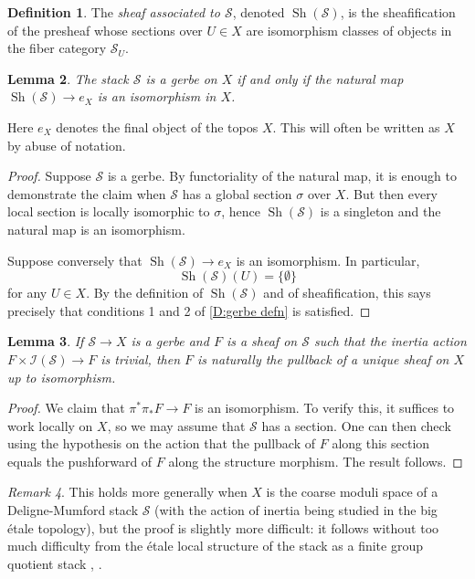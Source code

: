 \documentclass[11pt]{amsart}
\newcommand{\ms}[1]{\mathscr #1}
\DeclareMathOperator{\sh}{Sh}
\renewcommand{\[}{[\!\hspace{0.03em}[}
\renewcommand{\]}{]\!\hspace{0.03em}]}
\renewcommand{\(}{(\!\hspace{0.03em}(}
\renewcommand{\)}{)\!\hspace{0.03em})}
\newtheorem{lem}{Lemma}[subsubsection]%
\theoremstyle{definition}
\newtheorem{defn}[lem]{Definition}
\theoremstyle{remark}
\newtheorem{remark}[lem]{Remark}
\newenvironment{rem}{\begin{remark}}{\nolinebreak{\hfill $\blacklozenge$} \end{remark}}
\begin{document}
\begin{defn}\label{D:associated sheaf} The \emph{sheaf associated to $\ms S$\/}, denoted 
$\sh(\ms S)$, is the sheafification of 
the presheaf whose sections over $U\in X$ are isomorphism classes of 
objects in the fiber category $\ms S_{U}$.
\end{defn}

\begin{lem}\label{L:gerbe if sheaf is base} The stack $\ms S$ is a gerbe on $X$ if and only if the 
natural map $\sh(\ms S)\to e_{X}$ is an isomorphism in $X$.
\end{lem}
Here $e_{X}$ denotes the final object of the topos $X$.  This will 
often be written as $X$ by abuse of notation.
\begin{proof} Suppose $\ms S$ is a gerbe.  By functoriality of the natural 
map, it is enough to demonstrate the claim when $\ms S$ has a global 
section $\sigma$ over $X$.  But then every local section is locally isomorphic 
to $\sigma$, hence $\sh(\ms S)$ is a singleton and the natural map is 
an isomorphism.

Suppose conversely that $\sh(\ms S)\to e_{X}$ is an isomorphism.  In 
particular, $$\sh(\ms S)(U)=\{\emptyset\}$$ for any $U\in X$.  By the 
definition of $\sh(\ms S)$ and of sheafification, this says precisely that 
conditions 1 and 2 of 
\ref{D:gerbe defn} is satisfied.  
\end{proof}

\begin{lem}\label{L:descend sheaf on gerbe} If $\ms S\to X$ is a gerbe and $F$ is a 
sheaf on $\ms S$ such 
that the inertia action $F\times\ms I(\ms S)\to F$ is trivial, then 
$F$ is naturally the pullback of a unique sheaf on $X$ up to isomorphism.
\end{lem}
\begin{proof} We claim that $\pi^{\ast}\pi_{\ast}F\to F$ is an 
isomorphism.  To verify this, it suffices to work locally on $X$, so 
we may assume that $\ms S$ has a section.  One can then check using 
the hypothesis on the action that the pullback of $F$ along this 
section equals the pushforward of $F$ along the structure morphism.  
The result follows.
\end{proof}

\begin{rem} This holds more generally when $X$ is the coarse moduli space of a 
Deligne-Mumford stack $\ms S$ (with the action of inertia being 
studied in the big \'etale topology), but the proof is slightly more 
difficult: it follows without too much difficulty from the \'etale 
local structure of the stack as a finite group quotient 
stack \cite[\S6]{l-mb}, \cite{keel-mori}.
\end{rem}
\end{document}

